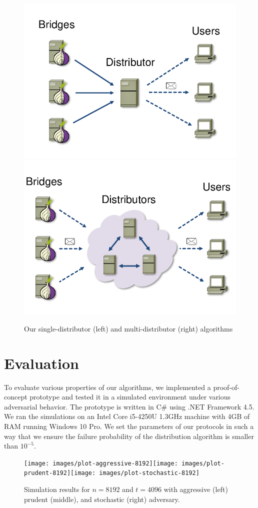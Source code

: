 \begin{figure}[t]
	\centering
	\includegraphics[width=0.47\linewidth]{images/single-alg}
	\hspace{2.2em}
	\includegraphics[width=0.47\linewidth]{images/multi-alg}
	\caption{Our single-distributor (left) and multi-distributor (right) algorithms}
	\label{fig:model}
\end{figure}

\section{Evaluation} \label{sec:simulations}
To evaluate various properties of our algorithms, we implemented a proof-of-concept prototype and tested it in a simulated environment under various adversarial behavior. The prototype is written in C\# using .NET Framework 4.5. We ran the simulations on an Intel Core i5-4250U 1.3GHz machine with 4GB of RAM running Windows 10 Pro. We set the parameters of our protocols in such a way that we ensure the failure probability of the distribution algorithm is smaller than $10^{-5}$.

\begin{figure}[tbph]
	\hspace{-0.8em}\texttt{[image: images/plot-aggressive-8192]}\hspace{-0.5em}\texttt{[image: images/plot-prudent-8192]}\hspace{-0.5em}\texttt{[image: images/plot-stochastic-8192]}\caption{Simulation results for $n=8192$ and $t=4096$ with aggressive (left)
		prudent (middle), and stochastic (right) adversary.}
	\label{fig:circuit-1} 
\end{figure}

